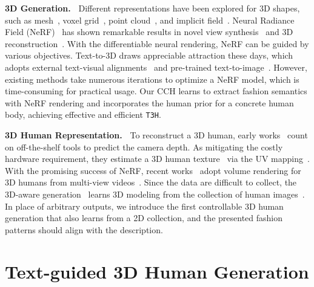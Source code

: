 \documentclass[11pt]{article}
\begin{document}
\vspace{1ex} \noindent \textbf{3D Generation.~}
Different representations have been explored for 3D shapes, such as mesh~\cite{gao2019sdm-net,nash2020poly-gen,henderson2020mesh}, voxel grid~\cite{tatarchenko2017octree,li2017grass}, point cloud~\cite{li2018pc-gan,yang2019point-flow,luo2021surf-gen}, and implicit field~\cite{chen2019sdf,park2019deep-sdf,zheng2022sdf-style-gan}. Neural Radiance Field (NeRF)~\cite{mildenhall2020nerf,barron2022mip-nerf,muller2022instant-ngp} has shown remarkable results in novel view synthesis~\cite{schwarz2021graf,chan2021pi-gan,skorokhodov20233d-imagenet} and 3D reconstruction~\cite{yariv2021vol-sdf,zhang2021ners}. With the differentiable neural rendering, NeRF can be guided by various objectives. Text-to-3D draws appreciable attraction these days, which adopts external text-visual alignments~\cite{jain2022dream-field,mohammad2022clip-mesh,michel2022text2mesh,wang2022clip-nerf,hong2022avatar-clip} and pre-trained text-to-image~\cite{wang2022sjc,nam20223d-ldm, poole2023dream-fusion,metzer2023latent-nerf,tang2023make-it-3d,seo20233d-fuse}. However, existing methods take numerous iterations to optimize a NeRF model, which is time-consuming for practical usage. Our CCH learns to extract fashion semantics with NeRF rendering and incorporates the human prior for a concrete human body, achieving effective and efficient \texttt{T3H}.

\vspace{1ex} \noindent \textbf{3D Human Representation.~}
To reconstruct a 3D human, early works~\cite{collet2015human,guo2019relightables,su2020robust-fusion} count on off-the-shelf tools to predict the camera depth. As mitigating the costly hardware requirement, they estimate a 3D human texture~\cite{xu2021texformer,gomes2022uv} via the UV mapping~\cite{shysheya2019uv,yoon2021uv}. With the promising success of NeRF, recent works~\cite{peng2021neural-body,peng2021ani-nerf,su2021a-nerf} adopt volume rendering for 3D humans from multi-view videos~\cite{weng2022human-nerf,chen2022gp-nerf}. Since the data are difficult to collect, the 3D-aware generation~\cite{chan2022eg3d,gu2022style-nerf,noguchi2022enarf-gan} learns 3D modeling from the collection of human images~\cite{yang20223d-human-gan,hong2023eva3d}. In place of arbitrary outputs, we introduce the first controllable 3D human generation that also learns from a 2D collection, and the presented fashion patterns should align with the description.

\section{Text-guided 3D Human Generation}
\end{document}
